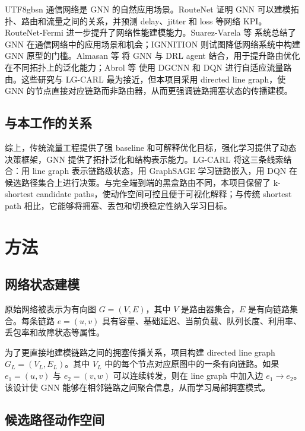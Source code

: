 \documentclass[9pt,a4paper,twocolumn,twoside]{rho-class/rho}
\begin{document}
\begin{CJK*}{UTF8}{gbsn}
通信网络是 GNN 的自然应用场景。RouteNet \cite{rusek2020routenet} 证明 GNN 可以建模拓扑、路由和流量之间的关系，并预测 delay、jitter 和 loss 等网络 KPI。RouteNet-Fermi \cite{suarezvarela2022routenetfermi} 进一步提升了网络性能建模能力。Suarez-Varela 等 \cite{suarezvarela2022graph} 系统总结了 GNN 在通信网络中的应用场景和机会；IGNNITION \cite{pujolperich2021ignnition} 则试图降低网络系统中构建 GNN 原型的门槛。Almasan 等 \cite{almasan2019deep} 将 GNN 与 DRL agent 结合，用于提升路由优化在不同拓扑上的泛化能力；Abrol 等 \cite{abrol2024deep} 使用 DGCNN 和 DQN 进行自适应流量路由。这些研究与 LG-CARL 最为接近，但本项目采用 directed line graph，使 GNN 的节点直接对应链路而非路由器，从而更强调链路拥塞状态的传播建模。

\subsection{与本工作的关系}

综上，传统流量工程提供了强 baseline 和可解释优化目标，强化学习提供了动态决策框架，GNN 提供了拓扑泛化和结构表示能力。LG-CARL 将这三条线索结合：用 line graph 表示链路级状态，用 GraphSAGE 学习链路嵌入，用 DQN 在候选路径集合上进行决策。与完全端到端的黑盒路由不同，本项目保留了 k-shortest candidate paths，使动作空间可控且便于可视化解释；与传统 shortest path 相比，它能够将拥塞、丢包和切换稳定性纳入学习目标。

\section{方法}

\subsection{网络状态建模}

原始网络被表示为有向图 $G=(V,E)$，其中 $V$ 是路由器集合，$E$ 是有向链路集合。每条链路 $e=(u,v)$ 具有容量、基础延迟、当前负载、队列长度、利用率、丢包率和故障状态等属性。

为了更直接地建模链路之间的拥塞传播关系，项目构建 directed line graph $G_L=(V_L,E_L)$。其中 $V_L$ 中的每个节点对应原图中的一条有向链路。如果 $e_1=(u,v)$ 与 $e_2=(v,w)$ 可以连续转发，则在 line graph 中加入边 $e_1 \rightarrow e_2$。该设计使 GNN 能够在相邻链路之间聚合信息，从而学习局部拥塞模式。

\subsection{候选路径动作空间}


\end{CJK*}
\end{document}
